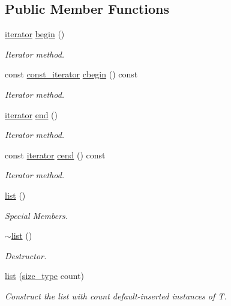 \subsection*{Public Member Functions}
\begin{DoxyCompactItemize}
\item 
\hyperlink{classsc_1_1list_1_1iterator}{iterator} \hyperlink{classsc_1_1list_a2fa015e137583d7142933500b34f1e29}{begin} ()
\begin{DoxyCompactList}\small\item\em Iterator method. \end{DoxyCompactList}\item 
const \hyperlink{classsc_1_1list_1_1const__iterator}{const\+\_\+iterator} \hyperlink{classsc_1_1list_ab198cb5a2a813b136d7f6689739052a5}{cbegin} () const
\begin{DoxyCompactList}\small\item\em Iterator method. \end{DoxyCompactList}\item 
\hyperlink{classsc_1_1list_1_1iterator}{iterator} \hyperlink{classsc_1_1list_a48429f0cf3d990fa6dfd5140e6aa95a7}{end} ()
\begin{DoxyCompactList}\small\item\em Iterator method. \end{DoxyCompactList}\item 
const \hyperlink{classsc_1_1list_1_1iterator}{iterator} \hyperlink{classsc_1_1list_ad88fa640e2b8c767663ccc185bf23219}{cend} () const
\begin{DoxyCompactList}\small\item\em Iterator method. \end{DoxyCompactList}\item 
\hyperlink{classsc_1_1list_ac7b95807230114dc58f2b1156cb3cdba}{list} ()
\begin{DoxyCompactList}\small\item\em Special Members. \end{DoxyCompactList}\item 
\hyperlink{classsc_1_1list_a3399256b9e2fa57bee383c2421722214}{$\sim$list} ()
\begin{DoxyCompactList}\small\item\em Destructor. \end{DoxyCompactList}\item 
\hyperlink{classsc_1_1list_a38c946e7fe092c01ea0c0fc3be19d11c}{list} (\hyperlink{classsc_1_1list_acbac64cff34d45bb9c61771493db48ec}{size\+\_\+type} count)
\begin{DoxyCompactList}\small\item\em Construct the list with count default-\/inserted instances of T. \end{DoxyCompactList}\item 

\end{DoxyCompactItemize}
